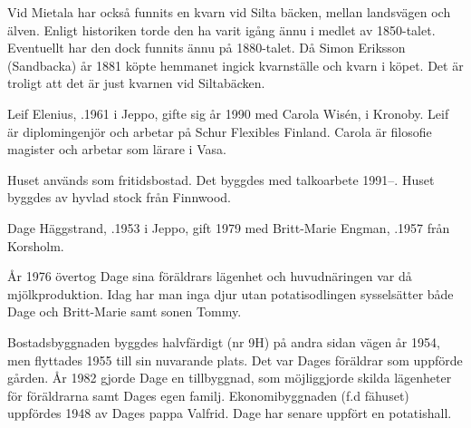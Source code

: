
Vid Mietala har också funnits en kvarn vid Silta bäcken, mellan landsvägen och älven. Enligt historiken torde den ha varit igång ännu i medlet av 1850-talet. Eventuellt har den dock funnits ännu på 1880-talet. Då Simon Eriksson (Sandbacka) år 1881 köpte hemmanet ingick kvarnställe och kvarn  i köpet. Det är troligt att det är just kvarnen vid 		Siltabäcken.





Leif Elenius, .1961 i Jeppo, gifte sig år 1990 med Carola Wisén,  i Kronoby. Leif är diplomingenjör och arbetar på Schur Flexibles Finland. Carola är filosofie magister och arbetar som lärare i Vasa.

\begin{jhchildren}
  \item {}
  \item {}
  \item {}
\end{jhchildren}

Huset används som fritidsbostad. Det byggdes med talkoarbete 1991--. Huset byggdes av hyvlad stock från Finnwood.





Dage Häggstrand, .1953 i Jeppo, gift 1979 med Britt-Marie Engman, .1957 från Korsholm.

\begin{jhchildren}
  \item {}
  \item {}
\end{jhchildren}

År 1976 övertog Dage sina föräldrars lägenhet och huvudnäringen var då mjölkproduktion. Idag har man inga djur utan potatisodlingen sysselsätter både Dage och Britt-Marie samt sonen Tommy.

Bostadsbyggnaden byggdes halvfärdigt (nr 9H) på andra sidan vägen år 1954, men flyttades 1955 till sin nuvarande plats. Det var Dages föräldrar som uppförde gården. År 1982 gjorde Dage en tillbyggnad, som möjliggjorde skilda lägenheter för föräldrarna samt Dages egen familj. Ekonomibyggnaden (f.d fähuset) uppfördes 1948 av Dages pappa Valfrid. Dage har senare uppfört en potatishall.


